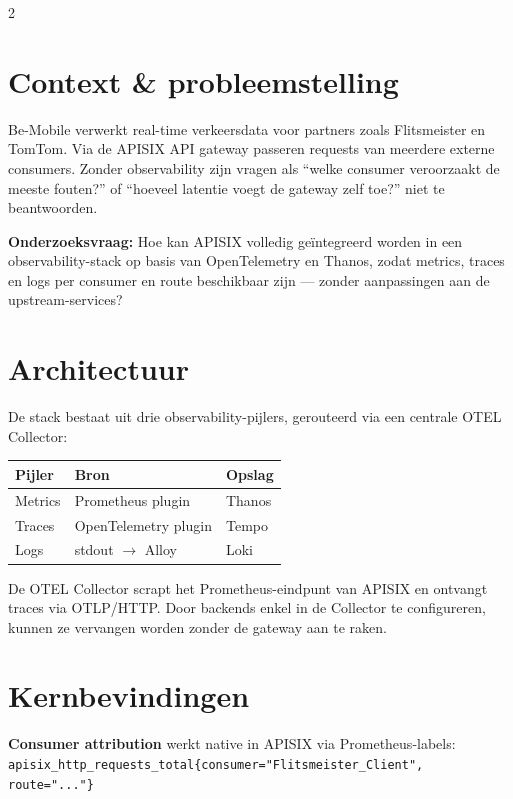 \documentclass[a0,portrait]{hogent-poster}
\begin{document}
\begin{multicols}{2}

\section{Context \& probleemstelling}

Be-Mobile verwerkt real-time verkeersdata voor partners zoals Flitsmeister en TomTom. Via de APISIX API gateway passeren requests van meerdere externe consumers. Zonder observability zijn vragen als ``welke consumer veroorzaakt de meeste fouten?'' of ``hoeveel latentie voegt de gateway zelf toe?'' niet te beantwoorden.

\textbf{Onderzoeksvraag:} Hoe kan APISIX volledig geïntegreerd worden in een observability-stack op basis van OpenTelemetry en Thanos, zodat metrics, traces en logs per consumer en route beschikbaar zijn --- zonder aanpassingen aan de upstream-services?

\section{Architectuur}

De stack bestaat uit drie observability-pijlers, gerouteerd via een centrale OTEL Collector:

\begin{center}
\begin{tabular}{lll}
\hline
\textbf{Pijler} & \textbf{Bron} & \textbf{Opslag} \\
\hline
Metrics & Prometheus plugin & Thanos \\
Traces  & OpenTelemetry plugin & Tempo \\
Logs    & stdout $\rightarrow$ Alloy & Loki \\
\hline
\end{tabular}
\end{center}

De OTEL Collector scrapt het Prometheus-eindpunt van APISIX en ontvangt traces via OTLP/HTTP. Door backends enkel in de Collector te configureren, kunnen ze vervangen worden zonder de gateway aan te raken.

\section{Kernbevindingen}

\textbf{Consumer attribution} werkt native in APISIX via Prometheus-labels:
\texttt{apisix\_http\_requests\_total\{consumer="Flitsmeister\_Client", route="..."\}}


\end{multicols}
\end{document}
